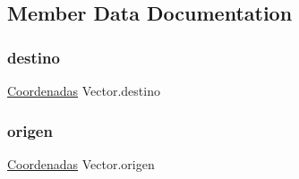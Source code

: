 \subsection{Member Data Documentation}
\mbox{\label{class_vector_af0a20e915c3efce53463578d8e73948e}} 
\subsubsection{\texorpdfstring{destino}{destino}}
{\footnotesize\ttfamily \mbox{\hyperlink{class_coordenadas}{Coordenadas}} Vector.\+destino\hspace{0.3cm}{\ttfamily [package]}}

\mbox{\label{class_vector_a3c83b7dd875429ec0bb3a799d928bc47}} 
\subsubsection{\texorpdfstring{origen}{origen}}
{\footnotesize\ttfamily \mbox{\hyperlink{class_coordenadas}{Coordenadas}} Vector.\+origen\hspace{0.3cm}{\ttfamily [private]}}

